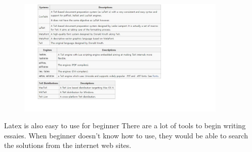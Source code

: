 \begin{figure}
	\includegraphics[width=10cm]{234}
\end{figure}

Latex is also easy to use for beginner There are a lot of tools to begin writing essaies. When beginner doesn't know how to use, they would be able to search the solutions from the internet web sites. 
